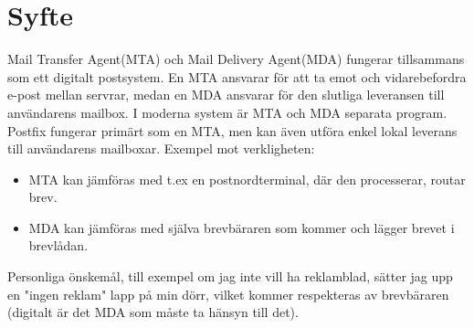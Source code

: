 \documentclass{report}
\begin{document}
\section{Syfte}
Mail Transfer Agent(MTA) och Mail Delivery Agent(MDA) fungerar tillsammans som ett digitalt postsystem.
En MTA ansvarar för att ta emot och vidarebefordra e-post mellan servrar, medan en MDA ansvarar för den slutliga leveransen till användarens mailbox. \cite{ULSAH}
\newline\newline
I moderna system är MTA och MDA separata program. Postfix fungerar primärt som en MTA, men kan även utföra enkel lokal leverans till användarens mailboxar.
\newline\newline
Exempel mot verkligheten: 
\begin{itemize}
    \item MTA kan jämföras med t.ex en postnordterminal, där den processerar, routar brev.
    \item MDA kan jämföras med själva brevbäraren som kommer och lägger brevet i brevlådan.
\end{itemize}
Personliga önskemål, till exempel om jag inte vill ha reklamblad, sätter jag upp en "ingen reklam" lapp på min dörr, vilket kommer respekteras av brevbäraren (digitalt är det MDA som måste ta hänsyn till det).
\end{document}
